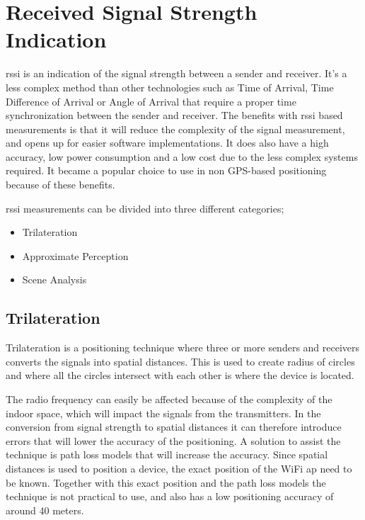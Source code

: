 \section{Received Signal Strength Indication}\label{sec:theoryRssi}
\acrfull{rssi} is an indication of the signal strength between a sender and receiver.
It's a less complex method than other technologies such as Time of Arrival, Time Difference of Arrival or
Angle of Arrival that require a proper time synchronization between the sender and receiver.
The benefits with \acrshort{rssi} based measurements is that it will reduce the complexity of the signal measurement, and opens up for easier software implementations.
It does also have a high accuracy, low power consumption and a low cost due to the less complex systems required.
It became a popular choice to use in non GPS-based positioning because of these benefits.\cite{IndoorFingerprintPositioning2017} 

\bigskip

\acrshort{rssi} measurements can be divided into three different categories;

\begin{itemize}
	\item Trilateration
	\item Approximate Perception
	\item Scene Analysis \cite{IndoorFingerprintPositioning2017}
\end{itemize}

\subsection{Trilateration}\label{sec:theoryRssiTrilateration} Trilateration
is a positioning technique where three or more senders and receivers converts the signals
into spatial distances.  This is used to create radius of circles and where all
the circles intersect with each other is where the device is located.
\cite{IndoorFingerprintPositioning2017} 

\bigskip

The radio frequency can easily be affected because of the complexity of the indoor space, which will impact the signals from the transmitters.
In the conversion from signal strength to spatial distances it can therefore introduce errors that will lower the accuracy of the positioning.
A solution to assist the technique is path loss models that will increase the accuracy.
Since spatial distances is used to position a device, the exact position of the WiFi \acrfull{ap} need to be known. 
Together with this exact position and the path loss models the technique is not practical to use, and also has a low positioning accuracy of around 40 meters.\cite{IndoorFingerprintPositioning2017}


